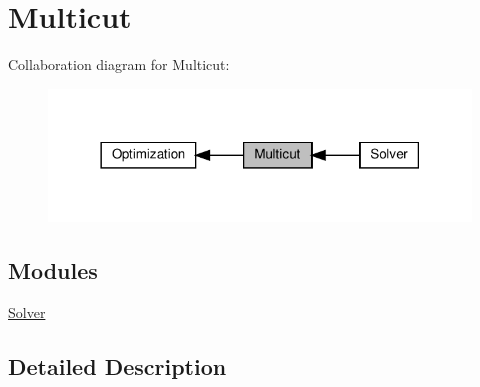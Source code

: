 \hypertarget{group__group__multicut}{}\section{Multicut}
\label{group__group__multicut}
Collaboration diagram for Multicut\+:
\nopagebreak
\begin{figure}[H]
\begin{center}
\leavevmode
\includegraphics[width=318pt]{group__group__multicut}
\end{center}
\end{figure}
\subsection*{Modules}
\begin{DoxyCompactItemize}
\item 
\hyperlink{group__group__multicut__solver}{Solver}
\end{DoxyCompactItemize}


\subsection{Detailed Description}
